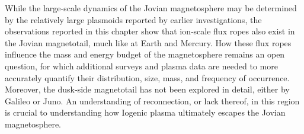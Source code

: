 While the large‐scale dynamics of the Jovian magnetosphere may be determined by the relatively large plasmoids reported by earlier investigations, the observations reported in this chapter show that ion‐scale flux ropes also exist in the Jovian magnetotail, much like at Earth and Mercury. How these flux ropes influence the mass and energy budget of the magnetosphere remains an open question, for which additional surveys and plasma data are needed to more accurately quantify their distribution, size, mass, and frequency of occurrence. Moreover, the dusk‐side magnetotail has not been explored in detail, either by Galileo or Juno. An understanding of reconnection, or lack thereof, in this region is crucial to understanding how Iogenic plasma ultimately escapes the Jovian magnetosphere.
